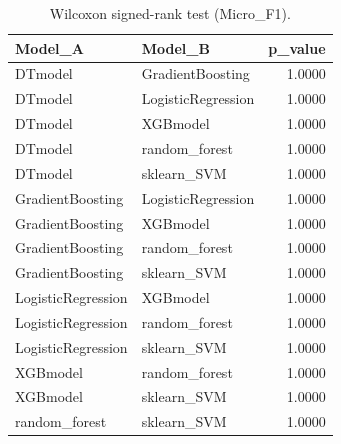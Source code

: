 \begin{table}[t]
\centering
\begin{tabular}{llr}
\toprule
Model_A & Model_B & p_value \\
\midrule
DTmodel & GradientBoosting & 1.0000 \\
DTmodel & LogisticRegression & 1.0000 \\
DTmodel & XGBmodel & 1.0000 \\
DTmodel & random_forest & 1.0000 \\
DTmodel & sklearn_SVM & 1.0000 \\
GradientBoosting & LogisticRegression & 1.0000 \\
GradientBoosting & XGBmodel & 1.0000 \\
GradientBoosting & random_forest & 1.0000 \\
GradientBoosting & sklearn_SVM & 1.0000 \\
LogisticRegression & XGBmodel & 1.0000 \\
LogisticRegression & random_forest & 1.0000 \\
LogisticRegression & sklearn_SVM & 1.0000 \\
XGBmodel & random_forest & 1.0000 \\
XGBmodel & sklearn_SVM & 1.0000 \\
random_forest & sklearn_SVM & 1.0000 \\
\bottomrule
\end{tabular}
\caption{Wilcoxon signed-rank test (Micro_F1).}
\label{tab:wilcoxon_Micro_F1}
\end{table}